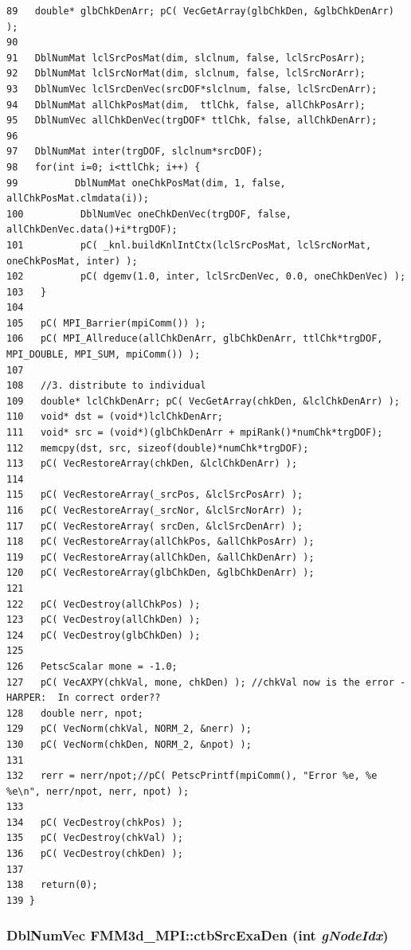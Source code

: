 \begin{verbatim}
89   double* glbChkDenArr; pC( VecGetArray(glbChkDen, &glbChkDenArr) );
90   
91   DblNumMat lclSrcPosMat(dim, slclnum, false, lclSrcPosArr);
92   DblNumMat lclSrcNorMat(dim, slclnum, false, lclSrcNorArr);
93   DblNumVec lclSrcDenVec(srcDOF*slclnum, false, lclSrcDenArr);
94   DblNumMat allChkPosMat(dim,  ttlChk, false, allChkPosArr);
95   DblNumVec allChkDenVec(trgDOF* ttlChk, false, allChkDenArr);
96   
97   DblNumMat inter(trgDOF, slclnum*srcDOF);
98   for(int i=0; i<ttlChk; i++) {
99          DblNumMat oneChkPosMat(dim, 1, false, allChkPosMat.clmdata(i));
100          DblNumVec oneChkDenVec(trgDOF, false, allChkDenVec.data()+i*trgDOF);
101          pC( _knl.buildKnlIntCtx(lclSrcPosMat, lclSrcNorMat, oneChkPosMat, inter) );
102          pC( dgemv(1.0, inter, lclSrcDenVec, 0.0, oneChkDenVec) );
103   }
104   
105   pC( MPI_Barrier(mpiComm()) );
106   pC( MPI_Allreduce(allChkDenArr, glbChkDenArr, ttlChk*trgDOF, MPI_DOUBLE, MPI_SUM, mpiComm()) );
107   
108   //3. distribute to individual
109   double* lclChkDenArr; pC( VecGetArray(chkDen, &lclChkDenArr) );
110   void* dst = (void*)lclChkDenArr;
111   void* src = (void*)(glbChkDenArr + mpiRank()*numChk*trgDOF);  
112   memcpy(dst, src, sizeof(double)*numChk*trgDOF);
113   pC( VecRestoreArray(chkDen, &lclChkDenArr) );
114   
115   pC( VecRestoreArray(_srcPos, &lclSrcPosArr) );
116   pC( VecRestoreArray(_srcNor, &lclSrcNorArr) );
117   pC( VecRestoreArray( srcDen, &lclSrcDenArr) );
118   pC( VecRestoreArray(allChkPos, &allChkPosArr) );
119   pC( VecRestoreArray(allChkDen, &allChkDenArr) );
120   pC( VecRestoreArray(glbChkDen, &glbChkDenArr) );
121   
122   pC( VecDestroy(allChkPos) );
123   pC( VecDestroy(allChkDen) );
124   pC( VecDestroy(glbChkDen) );
125   
126   PetscScalar mone = -1.0;
127   pC( VecAXPY(chkVal, mone, chkDen) ); //chkVal now is the error - HARPER:  In correct order??
128   double nerr, npot;
129   pC( VecNorm(chkVal, NORM_2, &nerr) );
130   pC( VecNorm(chkDen, NORM_2, &npot) );
131   
132   rerr = nerr/npot;//pC( PetscPrintf(mpiComm(), "Error %e, %e %e\n", nerr/npot, nerr, npot) );
133   
134   pC( VecDestroy(chkPos) );
135   pC( VecDestroy(chkVal) );
136   pC( VecDestroy(chkDen) );
137   
138   return(0);
139 }
\end{verbatim}\normalsize 


\subsubsection{\setlength{\rightskip}{0pt plus 5cm}Dbl\-Num\-Vec FMM3d\_\-MPI::ctb\-Src\-Exa\-Den (int {\em g\-Node\-Idx})\hspace{0.3cm}{\tt  [protected]}}\label{classFMM3d__MPI_99138c2857a67a0f74ce4f752045aab1_99138c2857a67a0f74ce4f752045aab1}


